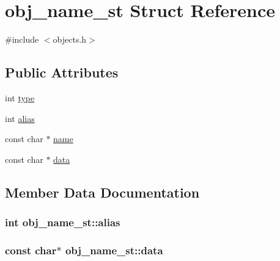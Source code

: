 \hypertarget{structobj__name__st}{}\section{obj\+\_\+name\+\_\+st Struct Reference}
\label{structobj__name__st}


{\ttfamily \#include $<$objects.\+h$>$}

\subsection*{Public Attributes}
\begin{DoxyCompactItemize}
\item 
int \hyperlink{structobj__name__st_ac9b1720c0e892bb82abafa95f4c28bfd}{type}
\item 
int \hyperlink{structobj__name__st_a436535b057606678c612d6e0ff87b301}{alias}
\item 
const char $\ast$ \hyperlink{structobj__name__st_a123db40ac48c32bf473c4bdd0dd961fc}{name}
\item 
const char $\ast$ \hyperlink{structobj__name__st_afdb47f10daa01b71995d9b30d696ac68}{data}
\end{DoxyCompactItemize}


\subsection{Member Data Documentation}
\subsubsection[{\texorpdfstring{alias}{alias}}]{\setlength{\rightskip}{0pt plus 5cm}int obj\+\_\+name\+\_\+st\+::alias}\hypertarget{structobj__name__st_a436535b057606678c612d6e0ff87b301}{}\label{structobj__name__st_a436535b057606678c612d6e0ff87b301}
\subsubsection[{\texorpdfstring{data}{data}}]{\setlength{\rightskip}{0pt plus 5cm}const char$\ast$ obj\+\_\+name\+\_\+st\+::data}\hypertarget{structobj__name__st_afdb47f10daa01b71995d9b30d696ac68}{}\label{structobj__name__st_afdb47f10daa01b71995d9b30d696ac68}
